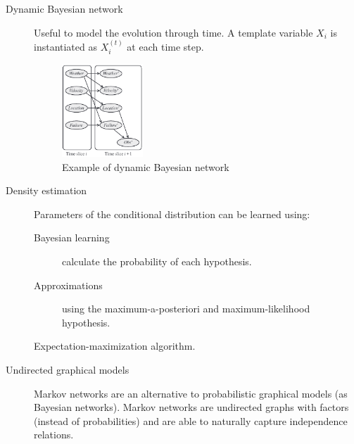 \begin{description}
    \item[Dynamic Bayesian network] 
        Useful to model the evolution through time.
        A template variable $X_i$ is instantiated as $X_i^{(t)}$ at each time step.
        \begin{figure}[h]
            \centering
            \includegraphics[width=0.3\textwidth]{img/_dynamic_bn_example.pdf}
            \caption{Example of dynamic Bayesian network}
        \end{figure}

    \item[Density estimation] 
        Parameters of the conditional distribution can be learned using:
        \begin{description}
            \item[Bayesian learning] calculate the probability of each hypothesis.
            \item[Approximations] using the maximum-a-posteriori and maximum-likelihood hypothesis.
            \item[Expectation-maximization algorithm{\normalfont.}] 
        \end{description}

    \item[Undirected graphical models] 
        Markov networks are an alternative to probabilistic graphical models (as Bayesian networks).
        Markov networks are undirected graphs with factors (instead of probabilities) and
        are able to naturally capture independence relations.
\end{description}